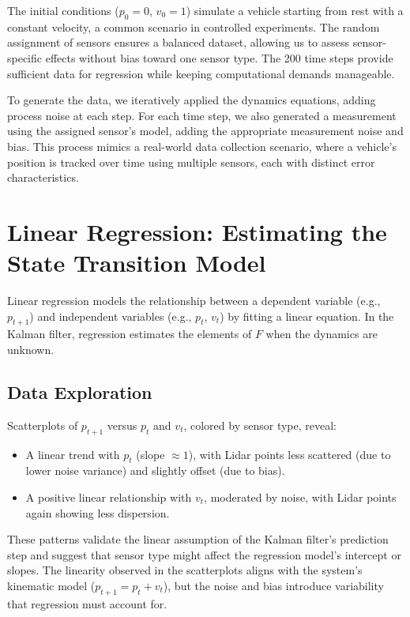 \documentclass[12pt]{article}
\begin{document}
The initial conditions (\( p_0 = 0 \), \( v_0 = 1 \)) simulate a vehicle starting from rest with a constant velocity, a common scenario in controlled experiments. The random assignment of sensors ensures a balanced dataset, allowing us to assess sensor-specific effects without bias toward one sensor type. The 200 time steps provide sufficient data for regression while keeping computational demands manageable.

To generate the data, we iteratively applied the dynamics equations, adding process noise at each step. For each time step, we also generated a measurement using the assigned sensor’s model, adding the appropriate measurement noise and bias. This process mimics a real-world data collection scenario, where a vehicle’s position is tracked over time using multiple sensors, each with distinct error characteristics.

\section{Linear Regression: Estimating the State Transition Model}
\label{sec:regression}

Linear regression models the relationship between a dependent variable (e.g., \( p_{t+1} \)) and independent variables (e.g., \( p_t \), \( v_t \)) by fitting a linear equation. In the Kalman filter, regression estimates the elements of \( F \) when the dynamics are unknown.

\subsection{Data Exploration}
\label{subsec:data_exploration}

Scatterplots of \( p_{t+1} \) versus \( p_t \) and \( v_t \), colored by sensor type, reveal:
\begin{itemize}
    \item A linear trend with \( p_t \) (slope \(\approx 1\)), with Lidar points less scattered (due to lower noise variance) and slightly offset (due to bias).
    \item A positive linear relationship with \( v_t \), moderated by noise, with Lidar points again showing less dispersion.
\end{itemize}

These patterns validate the linear assumption of the Kalman filter’s prediction step and suggest that sensor type might affect the regression model’s intercept or slopes. The linearity observed in the scatterplots aligns with the system’s kinematic model (\( p_{t+1} = p_t + v_t \)), but the noise and bias introduce variability that regression must account for.
\end{document}
